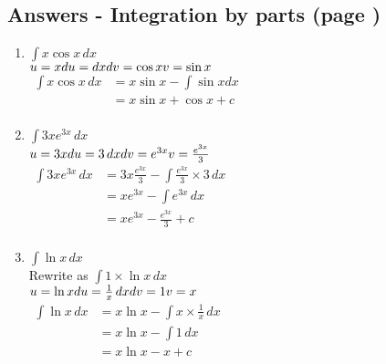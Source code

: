 \documentclass[../main.tex]{subfiles}
\begin{document}
\subsection*{Answers - Integration by parts (page \pageref{Integration by parts})}


\begin{enumerate}
    \item \(\int x\cos{x} \, dx\)\\
    \(u=x\\
    du=dx\\
    dv=\cos{x}\\
    v=\sin{x}\)\\
    $
    \!
    \begin{aligned}
        \int x\cos{x} \, dx 
        &= x\sin{x}-\int \sin{x} dx\\
        &=x\sin{x}+\cos{x}+c\\
    \end{aligned}
    $

    \item \(\int 3xe^{3x}\, dx\)\\
    \(u=3x\\
    du=3\,dx\\
    dv=e^{3x}\\
    v=\frac{e^{3x}}{3}\)\\
    $
    \!
    \begin{aligned}
        \int 3xe^{3x}\, dx 
        &=3x\frac{e^{3x}}{3}-\int \frac{e^{3x}}{3}\times 3 \,dx\\
        &=xe^{3x}-\int e^{3x}\, dx\\
        &=xe^{3x}-\frac{e^{3x}}{3}+c\\
    \end{aligned}
    $

    \item \(\int \ln{x}\, dx\)\\
    Rewrite as \(\int 1\times \ln{x}\, dx\)\\
    \(u=\ln{x}\\
    du=\frac{1}{x}\,dx\\
    dv=1\\
    v=x\)\\
    $
    \!
    \begin{aligned}
        \int \ln{x}\, dx
        &=x\ln{x}-\int x\times \frac{1}{x}\, dx\\
        &=x\ln{x}-\int 1\, dx\\
        &=x\ln{x}-x+c\\
    \end{aligned}
    $


\end{enumerate}
\end{document}
